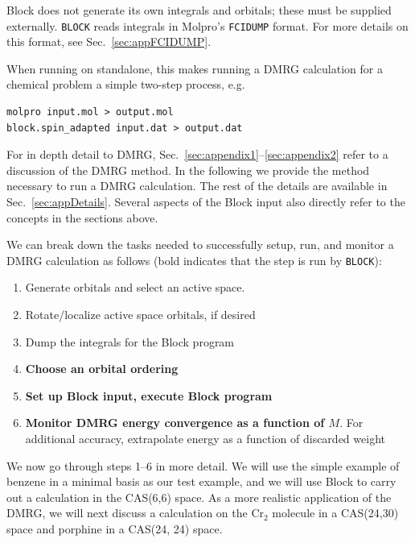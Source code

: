 \documentclass[letterpaper,12pt,aps, pra]{revtex4-1}
\begin{document}
Block does not generate its own integrals and orbitals; these must be supplied
externally. 
\texttt{BLOCK} reads integrals in Molpro's \texttt{FCIDUMP} format. For more details
on this format, see Sec.~\ref{sec:appFCIDUMP}.

When running on standalone, this makes
running a DMRG calculation for a chemical problem a simple two-step process,
e.g.

\begin{verbatim}
molpro input.mol > output.mol
block.spin_adapted input.dat > output.dat
\end{verbatim}

For in depth detail to DMRG, Sec.~\ref{sec:appendix1}--\ref{sec:appendix2}
refer to a discussion of the DMRG method.  In the following we provide the
method necessary to run a DMRG calculation.  The rest of the details are
available in Sec.~\ref{sec:appDetails}.  Several aspects of the Block input
also directly refer to the concepts in the sections above.

We can break down the tasks needed to successfully setup, run, and monitor a DMRG calculation as follows (bold indicates that the step is run by \texttt{BLOCK}):
\begin{enumerate}
\item  Generate orbitals and select an active space. 
\item  Rotate/localize active space orbitals, if desired
\item  Dump the integrals for the Block program
\item {\bf Choose an orbital ordering }
\item {\bf  Set up Block input, execute Block program}
\item {\bf  Monitor DMRG energy convergence as a function of $M$}. For additional accuracy, extrapolate energy as a function of discarded weight 
\end{enumerate}


We now go through steps 1--6 in more detail. We will use the simple example of benzene in a minimal basis as our test example, and we will use Block
to carry out a calculation in the CAS(6,6) space. As a more realistic application of the DMRG, we will next discuss a calculation on the Cr$_2$ molecule
in a CAS(24,30) space and porphine in a CAS(24, 24) space.
\end{document}
